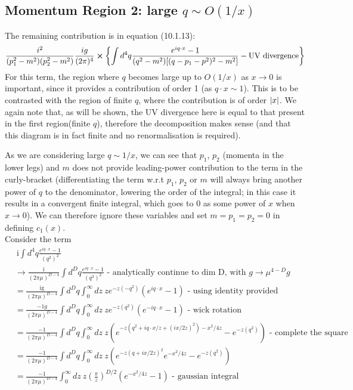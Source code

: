 \documentclass{article}
\begin{document}
\subsection{Momentum Region 2: large $q \sim O(1/x)$}\label{large q}
The remaining contribution is in equation (10.1.13):
\begin{equation} \label{eq:div_eg_large_q}
    \frac{i^2}{(p_1^2-m^2)(p_2^2-m^2)}\frac{ig}{(2\pi)^4}\cross\qty{\int d^4q \frac{e^{iq\cdot x}-1}{(q^2-m^2)[(q-p_1-p^2)^2-m^2]}-\text{UV divergence}}
\end{equation}
For this term, the region where $q$ becomes large up to $O(1/x)$ as $x \rightarrow 0$ is important, since it provides a contribution of order 1 (as $q\cdot x \sim 1$). This is to be contrasted with the region of finite $q$, where the contribution is of order $\abs{x}$. We again note that, as will be shown, the UV divergence here is equal to that present in the first region(finite $q$), therefore the decomposition makes sense (and that this diagram is in fact finite and no renormalisation is required).

As we are considering large $q \sim 1/x$, we can see that $p_1$, $p_2$ (momenta in the lower legs) and $m$ does not provide leading-power contribution to the term in the curly-bracket (differentiating the term w.r.t $p_1$, $p_2$ or $m$ will always bring another power of $q$ to the denominator, lowering the order of the integral; in this case it results in a convergent finite integral, which goes to $0$ as some power of $x$ when $x \rightarrow 0$). We can therefore ignore these variables and set $m=p_1=p_2=0$ in defining $c_1(x)$. \\

Consider the term
\begin{equation}
\begin{split}
    &\ \text{i}\int d^4q\frac{e^{iq\cdot x}-1}{(q^2)^2} \\
    &\rightarrow\frac{\text{i}}{(2\pi\mu)^{D-4}}\int d^Dq\frac{e^{iq\cdot x}-1}{(q^2)^2} \text{ - analytically continue to dim D, with } g \rightarrow \mu^{4-D}g\\
    &= \frac{\text{ig}}{(2\pi\mu)^{D-4}}\int d^Dq \int_0^\infty  dz\ z e^{-z(-q^2)} (e^{iq\cdot x}-1) \text{ - using identity provided}\\
    &= \frac{-1g}{(2\pi\mu)^{D-4}}\int d^Dq \int_0^\infty  dz\ z e^{-z(q^2)} (e^{-iq\cdot x}-1) \text{ - wick rotation}\\
    &= \frac{-1}{(2\pi\mu)^{D-4}}\int d^Dq \int_0^\infty  dz\ z (e^{-z(q^2+iq\cdot x/z+(ix/2z)^2)-x^2/4z}-e^{-z(q^2)}) \text{ - complete the square}\\
    &= \frac{-1}{(2\pi\mu)^{D-4}}\int d^Dq \int_0^\infty  dz\ z (e^{-z(q+ix/2z)^2}e^{-x^2/4z}-e^{-z(q^2)})\\
    &= \frac{-1}{(2\pi\mu)^{D-4}}\int_0^\infty  dz\ z (\frac{\pi}{z})^{D/2}(e^{-x^2/4z}-1)\text{ - gaussian integral}\\
\end{split}
\end{equation}
\end{document}
